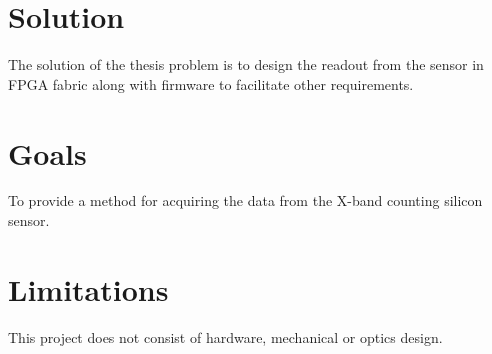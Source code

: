 \section{Solution}
The solution of the thesis problem is to design the readout from the sensor in FPGA fabric along with firmware to
facilitate other requirements. 

%
%


\section{Goals}
To provide a method for acquiring the data from the X-band counting silicon sensor.

\section{Limitations}
This project does not consist of hardware, mechanical or optics design.  
